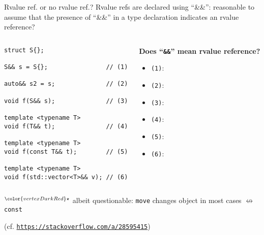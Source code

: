 \begin{frame}[fragile]{Rvalue ref. or no rvalue ref.?}
    Rvalue refs are declared using \enquote{\&\&}: reasonable to assume that the presence of \enquote{\&\&} in a type declaration indicates an rvalue reference?
    \begin{columns}
        \begin{column}{.45\textwidth}
            \begin{lstlisting}[numbers=none]
struct S{};

S&& s = S{};                // (1)

auto&& s2 = s;              // (2)

void f(S&& s);              // (3)

template <typename T>
void f(T&& t);              // (4)

template <typename T>
void f(const T&& t);        // (5)

template <typename T>
void f(std::vector<T>&& v); // (6)
            \end{lstlisting}
        \end{column}
        \begin{column}{.5\textwidth}
            \textbf{Does \enquote{\texttt{\&\&}} mean rvalue reference?}
            \begin{itemize}
                \item \texttt{(1)}: \only<1>{???}
                \item \texttt{(2)}: 
                \item \texttt{(3)}: 
                \item \texttt{(4)}: 
                \item \texttt{(5)}: 
                \item \texttt{(6)}: 
            \end{itemize}
        \end{column}
    \end{columns}

\end{frame}

\addtocounter{framenumber}{-1}
\begin{frame}
    ${}^{\color{vertexDarkRed}\star}$ albeit questionable: \texttt{move} changes object in most cases $\not\leftrightarrow$ \texttt{const}

    
    \hfill {}

    \begin{center}
        (cf. \href{https://stackoverflow.com/a/28595415}{\texttt{https://stackoverflow.com/a/28595415}})
    \end{center}
\end{frame}

